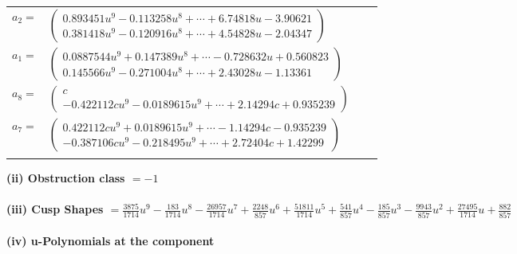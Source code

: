 \documentclass[1p]{elsarticle_modified}
\theoremstyle{definition}
\begin{document}
\begin{tabular}{m{7pt} m{180pt} m{7pt} m{180pt} }
\flushright $a_{2}=$&$\begin{pmatrix}0.893451 u^{9}-0.113258 u^{8}+\cdots+6.74818 u-3.90621\\0.381418 u^{9}-0.120916 u^{8}+\cdots+4.54828 u-2.04347\end{pmatrix}$ \\
\flushright $a_{1}=$&$\begin{pmatrix}0.0887544 u^{9}+0.147389 u^{8}+\cdots-0.728632 u+0.560823\\0.145566 u^{9}-0.271004 u^{8}+\cdots+2.43028 u-1.13361\end{pmatrix}$ \\
\flushright $a_{8}=$&$\begin{pmatrix}c\\-0.422112 c u^{9}-0.0189615 u^{9}+\cdots+2.14294 c+0.935239\end{pmatrix}$ \\
\flushright $a_{7}=$&$\begin{pmatrix}0.422112 c u^{9}+0.0189615 u^{9}+\cdots-1.14294 c-0.935239\\-0.387106 c u^{9}-0.218495 u^{9}+\cdots+2.72404 c+1.42299\end{pmatrix}$\\&\end{tabular}
\flushleft \textbf{(ii) Obstruction class $= -1$}\\~\\
\flushleft \textbf{(iii) Cusp Shapes $= \frac{3875}{1714} u^9-\frac{183}{1714} u^8-\frac{26957}{1714} u^7+\frac{2248}{857} u^6+\frac{51811}{1714} u^5+\frac{541}{857} u^4-\frac{185}{857} u^3-\frac{9943}{857} u^2+\frac{27495}{1714} u+\frac{882}{857}$}\\~\\
\newpage\renewcommand{\arraystretch}{1}
\flushleft \textbf{(iv) u-Polynomials at the component}\newline \\
\end{document}
